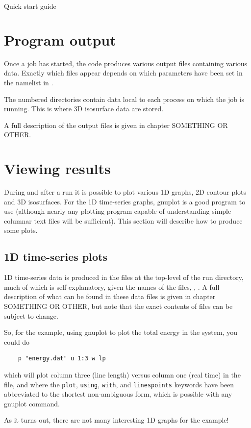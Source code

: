 \begin{chapter}{\label{cha:quickstart} Quick start guide}
  \section{Program output}
  Once a job has started, the code produces various output files containing
  various data.  Exactly which files appear depends on which parameters have
  been set in the  namelist in .

  The numbered  directories contain data local to each process on
  which the job is running.  This is where 3D isosurface data are stored.

  A full description of the output files is given in chapter SOMETHING OR
  OTHER.

  \section{Viewing results}
  During and after a run it is possible to plot various 1D graphs, 2D contour
  plots and 3D isosurfaces.  For the 1D time-series graphs, gnuplot is a good
  program to use (although nearly any plotting program capable of understanding
  simple columnar text files will be sufficient).  This section will describe
  how to produce some plots.
  
  \subsection{1D time-series plots}
  1D time-series data is produced in the  files at the top-level
  of the run directory, much of which is self-explanatory, given the names of
  the files, \eg {}, .  A full description
  of what can be found in these data files is given in chapter SOMETHING OR
  OTHER, but note that the exact contents of files can be subject to change.
  
  So, for the  example, using gnuplot to plot the total energy
  in the system, you could do
  \begin{Verbatim}
    p "energy.dat" u 1:3 w lp
  \end{Verbatim}
  which will plot column three (line length) versus column one (real time) in
  the file, and where the \verb"plot", \verb"using", \verb"with", and
  \verb"linespoints" keywords have been abbreviated to the shortest
  non-ambiguous form, which is possible with any gnuplot command.

  As it turns out, there are not many interesting 1D graphs for the
   example!


\end{chapter}
